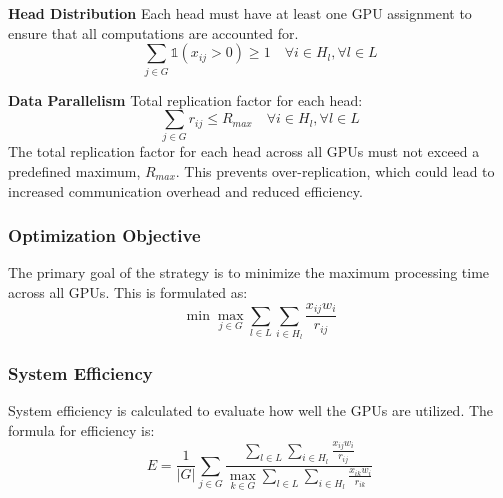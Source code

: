 \textbf{Head Distribution}
Each head must have at least one GPU assignment to ensure that all computations are accounted for.
\begin{equation}
    \sum_{j \in G} \mathbb{1}(x_{ij} > 0) \geq 1 \quad \forall i \in H_l, \forall l \in L
\end{equation}

\textbf{Data Parallelism}
Total replication factor for each head:
\begin{equation}
    \sum_{j \in G} r_{ij} \leq R_{max} \quad \forall i \in H_l, \forall l \in L
\end{equation}
The total replication factor for each head across all GPUs must not exceed a predefined maximum, $R_{max}$. This prevents over-replication, which could lead to increased communication overhead and reduced efficiency.

\subsubsection{Optimization Objective}
The primary goal of the \AlgName{} strategy is to minimize the maximum processing time across all GPUs. This is formulated as:
\begin{equation}
    \min \max_{j \in G} \sum_{l \in L} \sum_{i \in H_l} \frac{x_{ij} w_i}{r_{ij}}
\end{equation}

\subsubsection{System Efficiency}
System efficiency is calculated to evaluate how well the GPUs are utilized. The formula for efficiency is:
\begin{equation}
    E = \frac{1}{|G|} \sum_{j \in G} \frac{\sum_{l \in L} \sum_{i \in H_l} \frac{x_{ij} w_i}{r_{ij}}}{\max_{k \in G} \sum_{l \in L} \sum_{i \in H_l} \frac{x_{ik} w_i}{r_{ik}}}
\end{equation}

